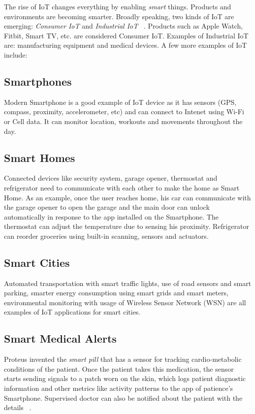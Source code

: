 \documentclass[sigconf]{acmart}
\begin{document}
	The rise of IoT changes everything by enabling {\em smart} things. Products and environments are becoming smarter. Broadly speaking, two kinds of IoT are emerging: {\em Consumer IoT} and {\em Industrial IoT} ~\cite{iot}. Products such as Apple Watch, Fitbit, Smart TV, etc. are considered Consumer IoT. Examples of Industrial IoT are: manufacturing equipment and medical devices. A few more examples of IoT include:
	
	\subsection{Smartphones}
	Modern Smartphone is a good example of IoT device as it has sensors (GPS, compass, proximity, accelerometer, etc) and can connect to Intenet using Wi-Fi or Cell data. It can monitor location, workouts and movements throughout the day.
	
	\subsection{Smart Homes}
	
	Connected devices like security system, garage opener, thermostat and refrigerator need to communicate with each other to make the home as Smart Home. As an example, once the user reaches home, his car can communicate with the garage opener to open the garage and the main door can unlock automatically in response to the app installed on the Smartphone. The thermostat can adjust the temperature due to sensing his proximity. Refrigerator can reorder groceries using built-in scanning, sensors and actuators. 	
	
	\subsection{Smart Cities}
	
	Automated transportation with smart traffic lights, use of road sensors and smart parking, smarter energy consumption using smart grids and smart meters, environmental monitoring with usage of Wireless Sensor Network (WSN) are all examples of IoT applications for smart cities.
	
	\subsection{Smart Medical Alerts}
	
	Proteus invented the {\em smart pill} that has a sensor for tracking cardio-metabolic conditions of the patient. Once the patient takes this medication, the sensor starts sending signals to a patch worn on the skin, which logs patient diagnostic information and other metrics like activity patterns to the app of patience's Smartphone. Supervised doctor can also be notified about the patient with the details ~\cite{proteus}.
	
\end{document}

